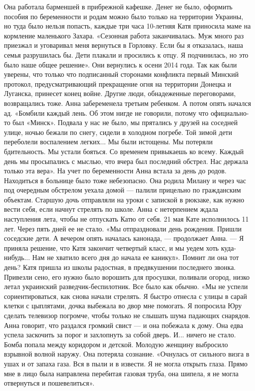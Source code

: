Она работала барменшей в прибрежной кафешке. Денег не было, оформить пособия по беременности и родам можно было только на территории Украины, но туда было нельзя попасть, каждые три часа 10-летняя Катя приносила маме на кормление маленького Захара.
«Сезонная работа заканчивалась. Муж много раз приезжал и уговаривал меня вернуться в Горловку. Если бы я отказалась, наша семья разрушилась бы. Дети плакали и просились к отцу. Я подчинилась, но это было наше общее решение».
Они вернулись к осени 2014 года. Так как были уверены, что только что подписанный сторонами конфликта первый Минский протокол, предусматривающий прекращение огня на территории Донецка и Луганска, принесет конец войне.
Другие люди, обнадеженные переговорами, возвращались тоже. Анна забеременела третьим ребенком. А потом опять начался ад.
«Бомбили каждый лень. Об этом нигде не говорили, потому что официально-то был «Минск». Подвала у нас не было, мы прятались у друзей на соседней улице, ночью бежали по снегу, сидели в холодном погребе. Той зимой дети переболели воспалением легких... Мы были истощены. Мы потеряли бдительность. Мы устали бояться. Со временем привыкаешь ко всему. Каждый день мы просыпались с мыслью, что вчера был последний обстрел. Нас держала только эта вера».
На учет по беременности Анна встала за день до родов. Находиться в больнице было тоже небезопасно. Она родила Милану и через час под очередным обстрелом уехала домой — палили прицельно по гражданским объектам.
Старшую дочь отправляли на уроки с запиской в рюкзаке, как нужно вести себя, если начнут стрелять по школе. Анна с нетерпением ждала наступления лета, чтобы не отпускать Катю от себя.
21 мая Кате исполнилось 11 лет. Через пять дней ее не стало.
«Мы отпраздновали день рождения. Пришли соседские дети. А вечером опять началась канонада, — продолжает Анна. — Я приняла решение, что Катя закончит четвертый класс, и мы уедем хоть куда-нибудь... Нам не хватило всего дня до начала ее каникул».
Помнит ли она тот день?
Катя пришла из школы радостная, в предвкушении последнего звонка. Привезли сено, его нужно было ворошить для просушки, поливали огород, низко летал украинский разведчик-беспилотник. Все было как обычно.
«Мы не успели сориентироваться, как снова начали стрелять. Я быстро отнесла с улицы в сарай клетки с цыплятами, дочка выбежала во двор мне помогать. Я попросила Юру сделать телевизор погромче, чтобы только не слышать шума падающих снарядов.
Анна говорит, что раздался громкий свист — и она побежала к дому. Она едва успела заскочить за порог и захлопнуть за собой дверь. И... ничего не стало.
Бомба попала между коридором и детской. Молодую женщину выбросило взрывной волной наружу. Она потеряла сознание. «Очнулась от сильного визга в ушах и от запаха газа. Вся в пыли и в извести. Я не могла открыть глаза. Прямо мне в лицо была направлена перебитая газовая труба, она шипела, я не могла отвернуться и пошевелиться».
